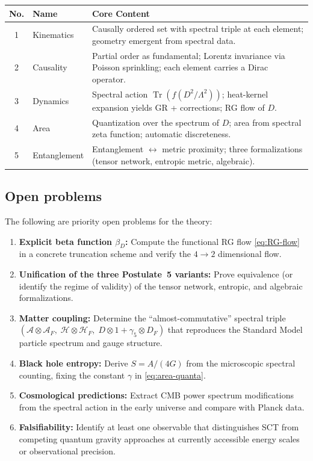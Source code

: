 \documentclass[12pt,a4paper]{article}
\theoremstyle{postulate}
\newcommand{\Tr}{\operatorname{Tr}}
\newcommand{\Hil}{\mathcal{H}}
\newcommand{\Alg}{\mathcal{A}}
\newcommand{\Dirac}{D}
\newcommand{\Cut}{\Lambda}
\begin{document}
\begin{center}
\renewcommand{\arraystretch}{1.2}
\begin{tabular}{@{}clp{8cm}@{}}
\toprule
\textbf{No.} & \textbf{Name} & \textbf{Core Content} \\
\midrule
1 & Kinematics &
Causally ordered set with spectral triple at each element;
geometry emergent from spectral data. \\
2 & Causality &
Partial order as fundamental; Lorentz invariance via Poisson sprinkling;
each element carries a Dirac operator. \\
3 & Dynamics &
Spectral action $\Tr(f(\Dirac^2/\Cut^2))$; heat-kernel expansion yields GR
+ corrections; RG flow of $\Dirac$. \\
4 & Area &
Quantization over the spectrum of $\Dirac$; area from spectral zeta function;
automatic discreteness. \\
5 & Entanglement &
Entanglement $\leftrightarrow$ metric proximity; three formalizations
(tensor network, entropic metric, algebraic). \\
\bottomrule
\end{tabular}
\end{center}

\subsection{Open problems}

The following are priority open problems for the theory:
\begin{enumerate}
  \item \textbf{Explicit beta function $\beta_{\Dirac}$:}\quad
        Compute the functional RG flow \eqref{eq:RG-flow} in a concrete
        truncation scheme and verify the $4 \to 2$ dimensional flow.
  \item \textbf{Unification of the three Postulate~5 variants:}\quad
        Prove equivalence (or identify the regime of validity) of the
        tensor network, entropic, and algebraic formalizations.
  \item \textbf{Matter coupling:}\quad
        Determine the ``almost-commutative'' spectral triple
        $(\Alg \otimes \Alg_F,\; \Hil \otimes \Hil_F,\; \Dirac \otimes 1 +
        \gamma_5 \otimes \Dirac_F)$ that reproduces the Standard Model
        particle spectrum and gauge structure.
  \item \textbf{Black hole entropy:}\quad
        Derive $S = A/(4G)$ from the microscopic spectral counting, fixing
        the constant $\gamma$ in \eqref{eq:area-quanta}.
  \item \textbf{Cosmological predictions:}\quad
        Extract CMB power spectrum modifications from the spectral action
        in the early universe and compare with Planck data.
  \item \textbf{Falsifiability:}\quad
        Identify at least one observable that distinguishes SCT from competing
        quantum gravity approaches at currently accessible energy scales
        or observational precision.
\end{enumerate}
\end{document}
